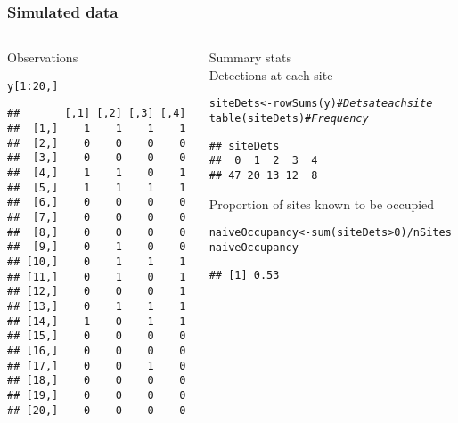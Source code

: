 \documentclass[color=usenames,dvipsnames]{beamer}\usepackage[]{graphicx}\usepackage[]{color}
\makeatletter
\newcommand{\hlnum}[1]{\textcolor[rgb]{0.69,0.494,0}{#1}}%
\newcommand{\hlcom}[1]{\textcolor[rgb]{0.514,0.506,0.514}{\textit{#1}}}%
\newcommand{\hlopt}[1]{\textcolor[rgb]{0,0,0}{#1}}%
\newcommand{\hlstd}[1]{\textcolor[rgb]{0,0,0}{#1}}%
\newcommand{\hlkwb}[1]{\textcolor[rgb]{0,0.341,0.682}{#1}}%
\newcommand{\hlkwd}[1]{\textcolor[rgb]{0.004,0.004,0.506}{#1}}%
\newenvironment{kframe}{%
 \def\at@end@of@kframe{}%
 \ifinner\ifhmode%
  \def\at@end@of@kframe{\end{minipage}}%
  \begin{minipage}{\columnwidth}%
 \fi\fi%
 \def\FrameCommand##1{\hskip\@totalleftmargin \hskip-\fboxsep
 \colorbox{shadecolor}{##1}\hskip-\fboxsep
     \hskip-\linewidth \hskip-\@totalleftmargin \hskip\columnwidth}%
 \MakeFramed {\advance\hsize-\width
   \@totalleftmargin\z@ \linewidth\hsize
   \@setminipage}}%
 {\par\unskip\endMakeFramed%
 \at@end@of@kframe}
\newenvironment{knitrout}{}{} %
\makeatother
\begin{document}
\begin{frame}[fragile]
  \frametitle{Simulated data}
  \begin{columns}
    \begin{column}{0.4\textwidth}
      \small
      Observations
\begin{knitrout}\scriptsize
{}\color{fgcolor}\begin{kframe}
\begin{alltt}
\hlstd{y[}\hlnum{1}\hlopt{:}\hlnum{20}\hlstd{,]}
\end{alltt}
\begin{verbatim}
##       [,1] [,2] [,3] [,4]
##  [1,]    1    1    1    1
##  [2,]    0    0    0    0
##  [3,]    0    0    0    0
##  [4,]    1    1    0    1
##  [5,]    1    1    1    1
##  [6,]    0    0    0    0
##  [7,]    0    0    0    0
##  [8,]    0    0    0    0
##  [9,]    0    1    0    0
## [10,]    0    1    1    1
## [11,]    0    1    0    1
## [12,]    0    0    0    1
## [13,]    0    1    1    1
## [14,]    1    0    1    1
## [15,]    0    0    0    0
## [16,]    0    0    0    0
## [17,]    0    0    1    0
## [18,]    0    0    0    0
## [19,]    0    0    0    0
## [20,]    0    0    0    0
\end{verbatim}
\end{kframe}
\end{knitrout}
  \end{column}
  \begin{column}{0.6\textwidth}
    \pause
    {\centering Summary stats \\}
    \vspace{24pt}
  Detections at each site \\
\begin{knitrout}\scriptsize
{}\color{fgcolor}\begin{kframe}
\begin{alltt}
\hlstd{siteDets} \hlkwb{<-} \hlkwd{rowSums}\hlstd{(y)} \hlcom{# Dets at each site}
\hlkwd{table}\hlstd{(siteDets)}        \hlcom{# Frequency}
\end{alltt}
\begin{verbatim}
## siteDets
##  0  1  2  3  4 
## 47 20 13 12  8
\end{verbatim}
\end{kframe}
\end{knitrout}
\pause
\vfill
\small
Proportion of sites known to be occupied \\
\begin{knitrout}\scriptsize
{}\color{fgcolor}\begin{kframe}
\begin{alltt}
\hlstd{naiveOccupancy} \hlkwb{<-} \hlkwd{sum}\hlstd{(siteDets}\hlopt{>}\hlnum{0}\hlstd{)}\hlopt{/}\hlstd{nSites}
\hlstd{naiveOccupancy}
\end{alltt}
\begin{verbatim}
## [1] 0.53
\end{verbatim}
\end{kframe}
\end{knitrout}


\end{column}
\end{columns}
\end{frame}
\end{document}
